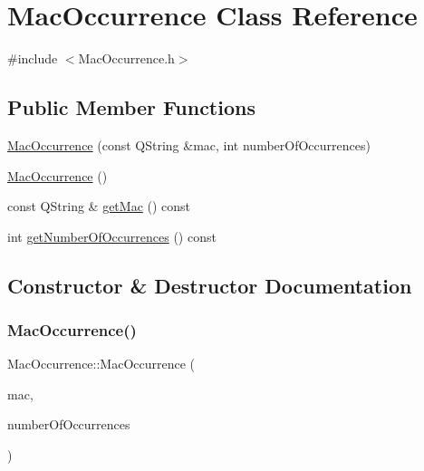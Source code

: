 \hypertarget{class_mac_occurrence}{}\section{Mac\+Occurrence Class Reference}
\label{class_mac_occurrence}


{\ttfamily \#include $<$Mac\+Occurrence.\+h$>$}

\subsection*{Public Member Functions}
\begin{DoxyCompactItemize}
\item 
\hyperlink{class_mac_occurrence_a095d5000ebf2de8695273c90b48fd085}{Mac\+Occurrence} (const Q\+String \&mac, int number\+Of\+Occurrences)
\item 
\hyperlink{class_mac_occurrence_aa897fe4ab6f2a8965c96772fe960bb74}{Mac\+Occurrence} ()
\item 
const Q\+String \& \hyperlink{class_mac_occurrence_a14f611517db7ea8079db8c386aa13288}{get\+Mac} () const
\item 
int \hyperlink{class_mac_occurrence_a0a23b36440fe88fd52cc2b3c148e4081}{get\+Number\+Of\+Occurrences} () const
\end{DoxyCompactItemize}


\subsection{Constructor \& Destructor Documentation}
\mbox{\label{class_mac_occurrence_a095d5000ebf2de8695273c90b48fd085}} 
\subsubsection{\texorpdfstring{Mac\+Occurrence()}{MacOccurrence()}\hspace{0.1cm}{\footnotesize\ttfamily [1/2]}}
{\footnotesize\ttfamily Mac\+Occurrence\+::\+Mac\+Occurrence (\begin{DoxyParamCaption}\item[{const Q\+String \&}]{mac,  }\item[{int}]{number\+Of\+Occurrences }\end{DoxyParamCaption})}


